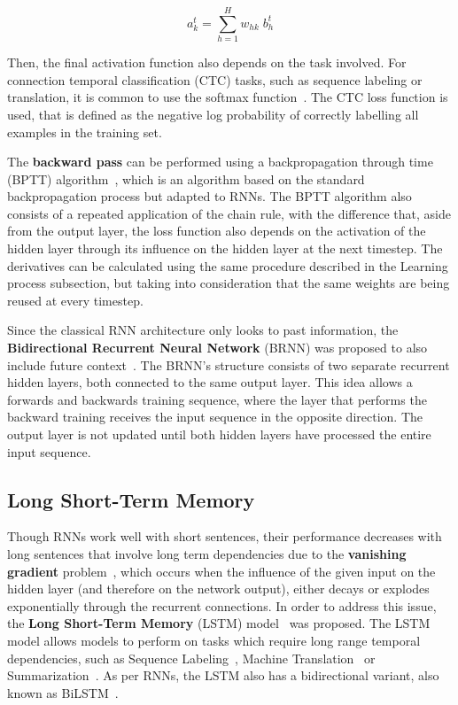 \begin{equation} \label{eq:outputStateRNN}
    a_k^t = \sum_{h=1}^H w_{hk} \; b_{h}^{t}	
\end{equation}

Then, the final activation function also depends on the task involved. For connection 
temporal classification (CTC) tasks, such as sequence labeling or translation, it is common 
to use the softmax function~\cite{appendix:graves2006connectionist}. The CTC loss function is 
used, that is defined as the negative log probability of correctly labelling all examples in 
the training set.

The \textbf{backward pass} can be performed using a backpropagation through time (BPTT) 
algorithm~\cite{appendix:williams1995gradient, semPar:werbos1990}, which is an algorithm 
based on the standard backpropagation process but adapted to RNNs. The BPTT algorithm also 
consists of a repeated application of the chain rule, with the difference that, aside from 
the output layer, the loss function also depends on the activation of the hidden layer 
through its influence on the hidden layer at the next timestep. The derivatives can be 
calculated using the same procedure described in the Learning process subsection, but taking 
into consideration that the same weights are being reused at every timestep.

Since the classical RNN architecture only looks to past information, the \textbf{Bidirectional 
Recurrent Neural Network} (BRNN) was proposed to also include future 
context~\cite{appendix:SchusterP97}. The BRNN’s structure consists of two separate recurrent 
hidden layers, both connected to the same output layer. This idea allows a forwards and 
backwards training sequence, where the layer that performs the backward training receives the 
input sequence in the opposite direction. The output layer is not updated until both hidden 
layers have processed the entire input sequence.

\subsection{Long Short-Term Memory}
\label{appendix:neuralNetworks/rnn/lstm}
Though RNNs work well with short sentences, their performance decreases with long sentences 
that involve long term dependencies due to the \textbf{vanishing gradient} 
problem~\cite{seqlab:HochreiterS97, appendix:hochreiter2001gradient}, which occurs when the 
influence of the given input on the hidden layer (and therefore on the network output), 
either decays or explodes exponentially through the recurrent connections. In order to 
address this issue, the \textbf{Long Short-Term Memory} (LSTM) model~\cite{seqlab:HochreiterS97} 
was proposed. The LSTM model allows models to perform on tasks which require long range 
temporal dependencies, such as Sequence Labeling~\cite{seqlab:HuangXY15, seqlab:MaH16}, 
Machine Translation~\cite{nlToSparql:WuSCLNMKCGMKSJL16} or Summarization~\cite{appendix:MahasseniLT17}. 
As per RNNs, the LSTM also has a bidirectional variant, also known as 
BiLSTM~\cite{appendix:graves2005framewise,appendix:ChenC04a,appendix:ThireouR07}. 

